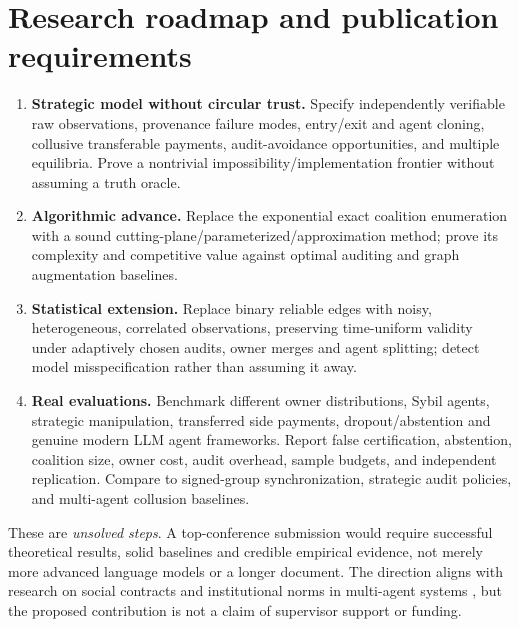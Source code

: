 \documentclass[10pt,a4paper]{article}
\begin{document}
\section{Research roadmap and publication requirements}
\begin{enumerate}
\item \textbf{Strategic model without circular trust.} Specify independently verifiable raw observations, provenance failure modes, entry/exit and agent cloning, collusive transferable payments, audit-avoidance opportunities, and multiple equilibria. Prove a nontrivial impossibility/implementation frontier without assuming a truth oracle.
\item \textbf{Algorithmic advance.} Replace the exponential exact coalition enumeration with a sound cutting-plane/parameterized/approximation method; prove its complexity and competitive value against optimal auditing and graph augmentation baselines.
\item \textbf{Statistical extension.} Replace binary reliable edges with noisy, heterogeneous, correlated observations, preserving time-uniform validity under adaptively chosen audits, owner merges and agent splitting; detect model misspecification rather than assuming it away.
\item \textbf{Real evaluations.} Benchmark different owner distributions, Sybil agents, strategic manipulation, transferred side payments, dropout/abstention and genuine modern LLM agent frameworks. Report false certification, abstention, coalition size, owner cost, audit overhead, sample budgets, and independent replication. Compare to signed-group synchronization, strategic audit policies, and multi-agent collusion baselines.
\end{enumerate}
These are \emph{unsolved steps}. A top-conference submission would require successful theoretical results, solid baselines and credible empirical evidence, not merely more advanced language models or a longer document. The direction aligns with research on social contracts and institutional norms in multi-agent systems \cite{davoust2020}, but the proposed contribution is not a claim of supervisor support or funding.
\end{document}
